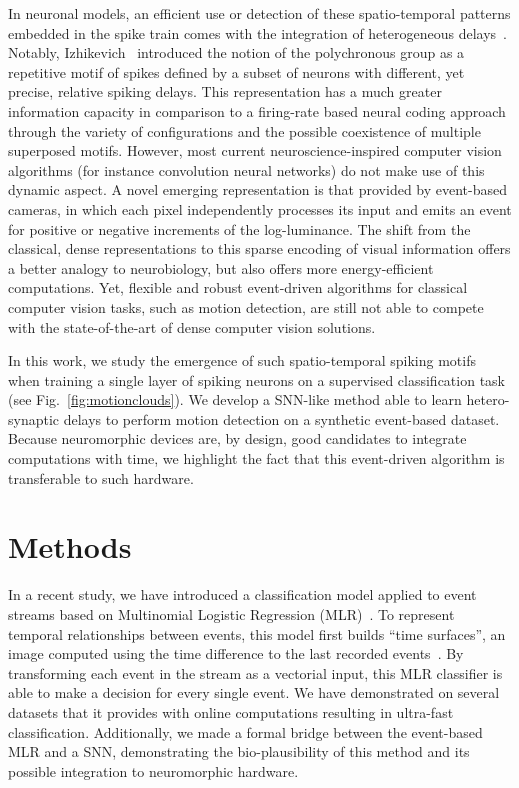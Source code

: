 \documentclass[default]{sn-jnl}%
\theoremstyle{thmstyleone}%
\theoremstyle{thmstyletwo}%
\theoremstyle{thmstylethree}%
\newcommand{\citep}[1]{\cite{#1}}
\newcommand{\citet}[1]{\cite{#1}}
\newcommand{\seeFig}[1]{see Fig.~\ref{fig:#1}}%
\begin{document}
In neuronal models, an efficient use or detection of these spatio-temporal patterns embedded in the spike train comes with the integration of heterogeneous delays~\cite{gutig2006tempotron, guise2014bayesian, zhang2020supervised}. Notably, Izhikevich~\citet{izhikevich2006polychronization} introduced the notion of the polychronous group as a repetitive motif of spikes defined by a subset of neurons with different, yet precise, relative spiking delays. This representation has a much greater information capacity in comparison to a firing-rate based neural coding approach through the variety of configurations and the possible coexistence of multiple superposed motifs.
However, most current neuroscience-inspired computer vision algorithms (for instance convolution neural networks) do not make use of this dynamic aspect. A novel emerging representation is that provided by event-based cameras, in which each pixel independently processes its input and emits an event for positive or negative increments of the log-luminance. The shift from the classical, dense representations to this sparse encoding of visual information offers a better analogy to neurobiology, but also offers more energy-efficient computations. Yet, flexible and robust event-driven algorithms for classical computer vision tasks, such as motion detection, are still not able to compete with the state-of-the-art of dense computer vision solutions.

In this work, we study the emergence of such spatio-temporal spiking motifs when training a single layer of spiking neurons on a supervised classification task (\seeFig{motionclouds}). We develop a SNN-like method able to learn hetero-synaptic delays to perform motion detection on a synthetic event-based dataset. Because neuromorphic devices are, by design, good candidates to integrate computations with time, we highlight the fact that this event-driven algorithm is transferable to such hardware.
%
\section{Methods}
\label{sec:methods}
%
In a recent study, we have introduced a classification model applied to event streams based on Multinomial Logistic Regression (MLR)~\citep{Grimaldi22pami}. To represent temporal relationships between events, this model first builds ``time surfaces'', an %
image computed using the time difference to the last recorded events~\citet{Lagorce17}. By transforming each event in the stream as a vectorial input, this MLR classifier is able to make a decision for every single event. We have demonstrated on several datasets that it provides with online computations resulting in ultra-fast classification. Additionally, we made a formal bridge between the event-based MLR and a SNN, demonstrating the bio-plausibility of this method and its possible integration to neuromorphic hardware.
\end{document}
